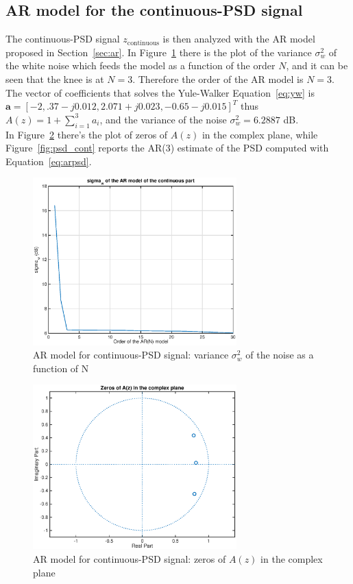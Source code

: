 \documentclass[10pt]{article}
\numberwithin{equation}{section}
\begin{document}
\subsection*{AR model for the continuous-PSD signal}
The continuous-PSD signal $z_{\text{continuous}}$ is then analyzed with the AR model proposed in Section~\ref{sec:ar}. In Figure~\ref{fig:ar_cont_sigma} there is the plot of the variance $\sigma_w^2$ of the white noise which feeds the model as a function of the order $N$, and it can be seen that the knee is at $N=3$. %
Therefore the order of the AR model is $N=3$. The vector of coefficients that solves the Yule-Walker Equation~\ref{eq:yw} is $\mathbf{a} = [-2,
.37 - j0.012, 2.071 + j0.023, -0.65 - j0.015]^T$ thus $A(z) = 1 + \sum_{i=1}^3a_i$, and the variance of the noise $\sigma_w^2 = 6.2887$ dB. \\ %
In Figure~\ref{fig:zpl_cont} there's the plot of zeros of $A(z)$ in the complex plane, while Figure~\ref{fig:psd_cont} reports the AR(3) estimate of the PSD computed with Equation~\ref{eq:arpsd}.

\begin{figure}[h!]
  \centering
  \includegraphics[width = 0.7\textwidth]{images/ar_continuous_sigma}
  \caption{AR model for continuous-PSD signal: variance $\sigma_w^2$ of the noise as a function of N}
  \label{fig:ar_cont_sigma}
\end{figure}

\begin{figure}[h!]
  \centering
  \includegraphics[width = 0.7\textwidth]{images/ar_continuous_zeros}
  \caption{AR model for continuous-PSD signal: zeros of $A(z)$ in the complex plane}
  \label{fig:zpl_cont}
\end{figure}
\end{document}
